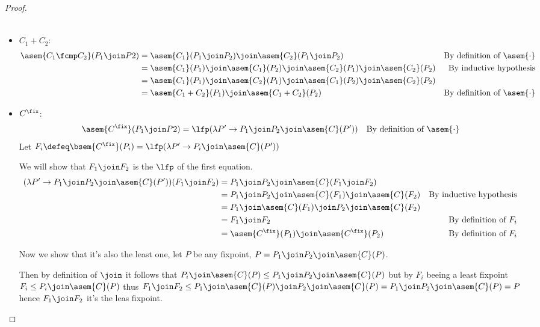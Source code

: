 \begin{proof}
\begin{itemize}
\begin{align*}
      \end{align*}
    \item $C_1 + C_2$:
      \begin{align*}
        \asem{C_1 \fcmp C_2}(P_1 \join P2)
          &= \asem{C_1}(P_1 \join P_2) \join \asem{C_2}(P_1 \join P_2)
          &\text{By definition of $\asem{\cdot}$} \\
          &= \asem{C_1}(P_1) \join \asem{C_1}(P_2) \join \asem{C_2}(P_1)
            \join \asem{C_2}(P_2)
          &\text{By inductive hypothesis} \\
          &= \asem{C_1}(P_1) \join \asem{C_2}(P_1) \join \asem{C_1}(P_2)
            \join \asem{C_2}(P_2) \\
          &= \asem{C_1 + C_2}(P_1) \join \asem{C_1 + C_2}(P_2)
          &\text{By definition of $\asem{\cdot}$} \\
      \end{align*}
    \item $C^\fix$:
      \begin{align*}
        \asem{C^\fix}(P_1 \join P2)
          &= \lfp(\lambda P' \to P_1 \join P_2 \join \asem{C}(P'))
          &\text{By definition of $\asem{\cdot}$}
      \end{align*}
      Let $F_i \defeq \bsem{C^\fix}(P_i) = \lfp(\lambda P' \to P_i \join 
      \asem{C}(P'))$

      We will show that $F_1 \join F_2$ is the $\lfp$ of the first equation.
      \begin{align*}
        (\lambda P' \to P_1 \join P_2 \join \asem{C}(P'))(F_1 \join F_2)
          &= P_1 \join P_2 \join \asem{C}(F_1 \join F_2) \\
          &= P_1 \join P_2 \join \asem{C}(F_1) \join \asem{C}(F_2) 
          &\text{By inductive hypothesis}\\
          &= P_1 \join \asem{C}(F_1) \join P_2 \join \asem{C}(F_2) \\
          &= F_1 \join F_2
          &\text{By definition of $F_i$}\\
          &= \asem{C^\fix}(P_1) \join \asem{C^\fix}(P_2)
          &\text{By definition of $F_i$}\\
      \end{align*}

      Now we show that it's also the least one, let $P$ be any fixpoint, 
      $P = P_1 \join P_2 \join \asem{C}(P)$.
      
      Then by definition of $\join$ it follows that $P_i \join \asem{C}(P) \leq 
      P_1 \join P_2 \join \asem{C}(P)$ but by $F_i$ beeing a least fixpoint
      $F_i \leq P_i \join \asem{C}(P)$ thus $F_1 \join F_2 \leq P_1
      \join \asem{C}(P) \join P_2 \join \asem{C}(P) = P_1 \join P_2 \join 
      \asem{C}(P) = P$ hence $F_1 \join F_2$ it's the leas fixpoint.
  \end{itemize}
\end{proof}

